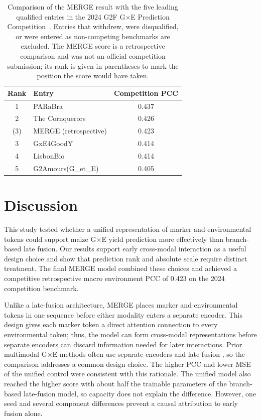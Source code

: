 \begin{table}[htbp]
    \centering
    \footnotesize
    \begin{tabularx}{\textwidth}{@{}c X c@{}}
        \toprule
        Rank & Entry & Competition PCC \\
        \midrule
        1 & PARaBra & 0.437 \\
        2 & The Cornquerors & 0.426 \\
        (3) & MERGE (retrospective) & 0.423 \\
        3 & GxE4GoodY & 0.414 \\
        4 & LisbonBio & 0.414 \\
        5 & G2Amours(G\_et\_E) & 0.405 \\
        \bottomrule
    \end{tabularx}
    \caption[Comparison of MERGE with leading competition entries]{Comparison of the MERGE result with the five leading qualified entries in the 2024 G2F G$\times$E Prediction Competition~\cite{batista2026competition}. Entries that withdrew, were disqualified, or were entered as non-competing benchmarks are excluded. The MERGE score is a retrospective comparison and was not an official competition submission; its rank is given in parentheses to mark the position the score would have taken.}
    \label{tab:ch3-external-results}
\end{table}


\section{Discussion}
This study tested whether a unified representation of marker and environmental tokens could support maize G$\times$E yield prediction more effectively than branch-based late fusion. Our results support early cross-modal interaction as a useful design choice and show that prediction rank and absolute scale require distinct treatment. The final MERGE model combined these choices and achieved a competitive retrospective macro environment PCC of $0.423$ on the 2024 competition benchmark.

Unlike a late-fusion architecture, MERGE places marker and environmental tokens in one sequence before either modality enters a separate encoder. This design gives each marker token a direct attention connection to every environmental token; thus, the model can form cross-modal representations before separate encoders can discard information needed for later interactions. Prior multimodal G$\times$E methods often use separate encoders and late fusion \cite{montesinos2024multimodal,shook2021crop}, so the comparison addresses a common design choice. The higher PCC and lower MSE of the unified control were consistent with this rationale. The unified model also reached the higher score with about half the trainable parameters of the branch-based late-fusion model, so capacity does not explain the difference. However, one seed and several component differences prevent a causal attribution to early fusion alone.

